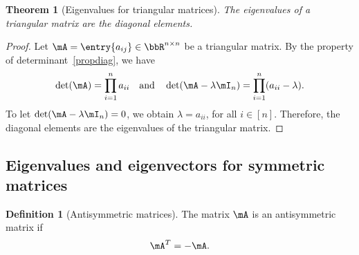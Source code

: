 \documentclass[11pt]{article}
\theoremstyle{plain}
\newtheorem{thm}{Theorem}[section]
\theoremstyle{definition}
\newtheorem{defn}{Definition}
\begin{document}
\begin{thm}[Eigenvalues for triangular matrices]\label{thm:trianeigen}
	The eigenvalues of a triangular matrix are the diagonal elements.
\end{thm}

\begin{proof}
Let $\mA = \entry{a_{ij}} \in \bbR^{n \times n}$ be a triangular matrix. By the property of determinant~\ref{propdiag}, we have
\[ \det(\mA) = \prod_{i=1}^n a_{ii}  \quad \text{and} \quad \det(\mA - \lambda \mI_n) = \prod_{i=1}^n (a_{ii}-\lambda). \]
To let $\det(\mA - \lambda \mI_n) = 0$, we obtain $\lambda = a_{ii}$, for all $ i\in[n]$. Therefore, the diagonal elements are the eigenvalues of the triangular matrix.
\end{proof}


\subsection{Eigenvalues and eigenvectors for symmetric matrices}

\begin{defn}[Antisymmetric matrices]
	The matrix $\mA$ is an antisymmetric matrix if 
	\[\mA^T = - \mA. \] 
\end{defn}
\end{document}
